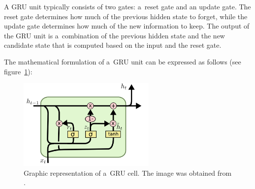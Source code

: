 A GRU \cite{DBLP:conf, olah2015understanding} unit typically consists of two gates: a~reset gate and an update gate. The reset gate determines how much of the previous hidden state to forget, while the update gate determines how much of the new information to keep. The output of the GRU unit is a~combination of the previous hidden state and the new candidate state that is computed based on the input and the reset gate.

The mathematical formulation of a~GRU unit can be expressed as follows (see figure~\ref{fig:LSTM3-var-GRU}):
    \begin{figure}[ht!]
        \centering
        \includegraphics[width = 0.6\textwidth]{obrazky-figures/LSTM3-var-GRU.png}
        \caption{Graphic representation of a~GRU cell. The image was obtained from \cite{olah2015understanding}.}
        \label{fig:LSTM3-var-GRU}
    \end{figure}

